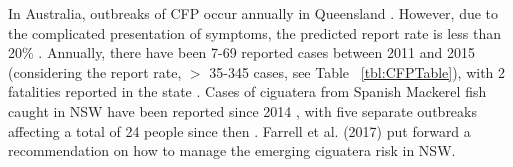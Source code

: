 \documentclass[12pt]{article}
\begin{document}
In Australia, outbreaks of CFP occur annually in Queensland \citep{qldcig}. 
However, due to the complicated presentation of symptoms, the predicted report rate is less than 20\% \citep{lewis2006ciguatera}. 
Annually, there have been 7-69 reported cases between 2011 and 2015 (considering the report rate, $>$ 35-345 cases, see Table ~\ref{tbl:CFPTable}), with 2 fatalities reported in the state \citep{tonge1967ciguatera}. 
Cases of ciguatera from Spanish Mackerel fish caught in NSW have been reported since 2014 \cite{farrellclinical}, with five separate outbreaks affecting a total of 24 people since then \citep{farrell2017management}. 
Farrell et al. (2017) put forward a recommendation on how to manage the emerging ciguatera risk in NSW.
\end{document}
